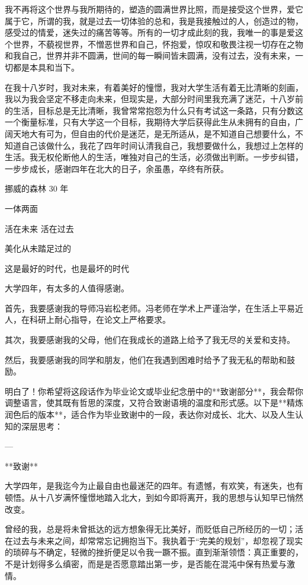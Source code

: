 \documentclass{pkuthesis}
\begin{document}
我不再将这个世界与我所期待的，塑造的圆满世界比照，而是接受这个世界，爱它属于它，所谓的我，就是过去一切体验的总和，我是我接触过的人，创造过的物，感受过的情爱，迷失过的痛苦等等。所有的一切才成此刻的我，我唯一的事是爱这个世界，不藐视世界，不憎恶世界和自己，怀抱爱，惊叹和敬畏注视一切存在之物和我自己，世界并非不圆满，世间的每一瞬间皆未圆满，没有过去，没有未来，一切都是本具和当下。

在我十八岁时，我对未来，有着美好的憧憬，我对大学生活有着无比清晰的刻画，我以为我会坚定不移走向未来，但现实是，大部分时间里我充满了迷茫，十八岁前的生活，目标总是无比清晰，我曾常常抱怨为什么只有考试这一条路，只有分数这一个衡量标准，只有大学这一个目标，我期待大学后获得此生从未拥有的自由，广阔天地大有可为，但自由的代价是迷茫，是无所适从，是不知道自己想要什么，不知道自己该做什么，我花了四年时间认清我自己，我想要做什么，我想过上怎样的生活。我无权伦断他人的生活，唯独对自己的生活，必须做出判断。一步步纠错，一步步成长，感谢四年在北大的日子，余虽愚，卒终有所获。


挪威的森林 30 年


一体两面


活在未来 活在过去


美化从未踏足过的

这是最好的时代，也是最坏的时代


大学四年，有太多的人值得感谢。

首先，我要感谢我的导师冯岩松老师。冯老师在学术上严谨治学，在生活上平易近人，在科研上耐心指导，在论文上严格要求。

其次，我要感谢我的父母，他们在我成长的道路上给予了我无尽的关爱和支持。

然后，我要感谢我的同学和朋友，他们在我遇到困难时给予了我无私的帮助和鼓励。


明白了！你希望将这段话作为毕业论文或毕业纪念册中的**致谢部分**，我会帮你调整语言，使其既有哲思的深度，又符合致谢语境的温度和形式感。以下是**精炼润色后的版本**，适合作为毕业致谢中的一段，表达你对成长、北大、以及人生认知的深层思考：

---

**致谢**

大学四年，是我迄今为止最自由也最迷茫的四年。有遗憾，有欢笑，有迷失，也有顿悟。从十八岁满怀憧憬地踏入北大，到如今即将离开，我的思想与认知早已悄然改变。

曾经的我，总是将未曾抵达的远方想象得无比美好，而贬低自己所经历的一切；活在过去与未来之间，却常常忘记拥抱当下。我执着于“完美的规划”，却忽视了现实的琐碎与不确定，轻微的挫折便足以令我一蹶不振。直到渐渐领悟：真正重要的，不是计划得多么缜密，而是是否愿意踏出第一步，是否能在混沌中保有热爱与激情。
\end{document}

